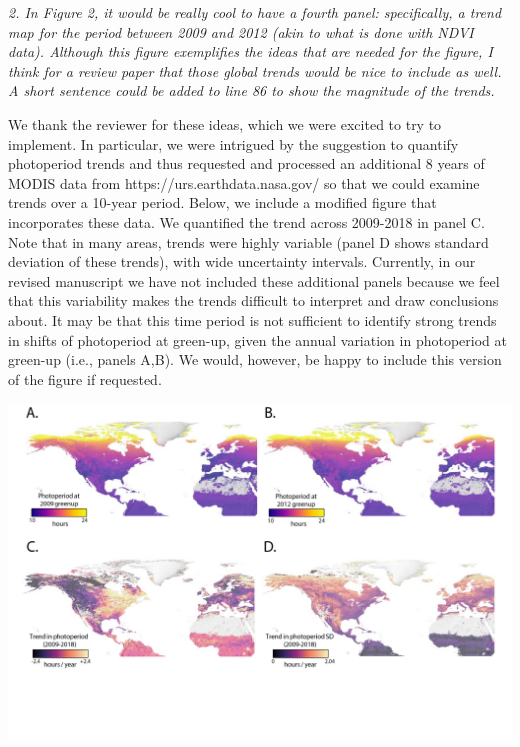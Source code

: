 \documentclass{article}
\begin{document}
\par \emph{2. In Figure 2, it would be really cool to have a fourth panel: specifically, a trend map for the period between 2009 and 2012 (akin to what is done with NDVI data). Although this figure exemplifies the ideas that are needed for the figure, I think for a review paper that those global trends would be nice to include as well. A short sentence could be added to line 86 to show the magnitude of the trends. }
\par We thank the reviewer for these ideas, which we were excited to try to implement. In particular,  we were intrigued by the suggestion to quantify photoperiod trends and thus requested and processed an additional 8 years of MODIS data from https://urs.earthdata.nasa.gov/ so that we could examine trends over a 10-year period. Below, we include a modified figure that incorporates these data. We quantified the trend across 2009-2018 in panel C. Note that in many areas, trends were highly variable (panel D shows standard deviation of these trends), with wide uncertainty intervals. Currently, in our revised manuscript we have not included these additional panels because we feel that this variability makes the trends difficult to interpret and draw conclusions about.  It may be that this time period is not sufficient to identify strong trends in shifts of photoperiod at green-up, given the annual variation in photoperiod at green-up (i.e., panels A,B). We would, however, be happy to include this version of the figure if requested.
\par
\includegraphics{../figures/Greenup_corr_sm_leg_4panels_sds.pdf} 
\end{document}
